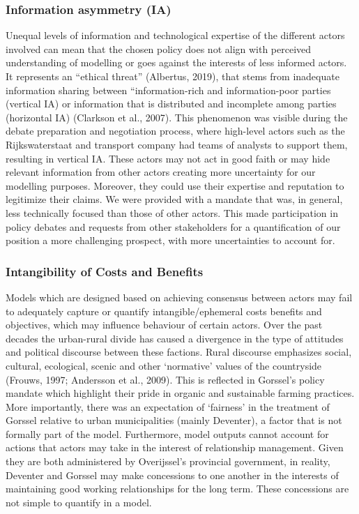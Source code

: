 \subsubsection{Information asymmetry (IA)}
Unequal levels of information and technological expertise of the different actors involved can mean that the chosen policy does not align with perceived understanding of modelling or goes against the interests of less informed actors. It represents an “ethical threat” (Albertus, 2019), that stems from inadequate information sharing between “information-rich and information-poor parties (vertical IA) or information that is distributed and incomplete among parties (horizontal IA) (Clarkson et al., 2007). This phenomenon was visible during the debate preparation and negotiation process, where high-level actors such as the Rijkswaterstaat and transport company had teams of analysts to support them, resulting in vertical IA. These actors may not act in good faith or may hide relevant information from other actors creating more uncertainty for our modelling purposes. Moreover, they could use their expertise and reputation to legitimize their claims. We were provided with a mandate that was, in general, less technically focused than those of other actors. This made participation in policy debates and requests from other stakeholders for a quantification of our position a more challenging prospect, with more uncertainties to account for. 

\subsubsection{Intangibility of Costs and Benefits}
Models which are designed based on achieving consensus between actors may fail to adequately capture or quantify intangible/ephemeral costs benefits and objectives, which may influence behaviour of certain actors. Over the past decades the urban-rural divide has caused a divergence in the type of attitudes and political discourse between these factions. Rural discourse emphasizes social, cultural, ecological, scenic and other ‘normative’ values of the countryside (Frouws, 1997; Andersson et al., 2009). This is reflected in Gorssel’s policy mandate which highlight their pride in organic and sustainable farming practices. More importantly, there was an expectation of ‘fairness’ in the treatment of Gorssel relative to urban municipalities (mainly Deventer), a factor that is not formally part of the model. Furthermore, model outputs cannot account for actions that actors may take in the interest of relationship management. Given they are both administered by Overijssel’s provincial government, in reality, Deventer and Gorssel may make concessions to one another in the interests of maintaining good working relationships for the long term. These concessions are not simple to quantify in a model. 

